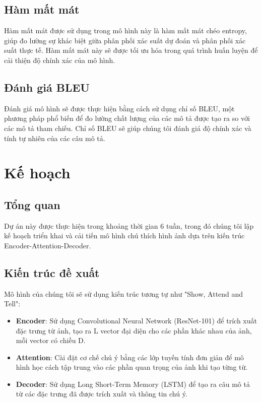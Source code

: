 \documentclass[conference]{IEEEtran}
\begin{document}
\subsection{Hàm mất mát}
Hàm mất mát được sử dụng trong mô hình này là hàm mất mát chéo entropy, giúp đo lường sự khác biệt giữa phân phối xác suất dự đoán và phân phối xác suất thực tế. Hàm mất mát này sẽ được tối ưu hóa trong quá trình huấn luyện để cải thiện độ chính xác của mô hình.

\subsection{Đánh giá BLEU}

Đánh giá mô hình sẽ được thực hiện bằng cách sử dụng chỉ số BLEU, một phương pháp phổ biến để đo lường chất lượng của các mô tả được tạo ra so với các mô tả tham chiếu. Chỉ số BLEU sẽ giúp chúng tôi đánh giá độ chính xác và tính tự nhiên của các câu mô tả.


\section{Kế hoạch}
\subsection{Tổng quan}
Dự án này được thực hiện trong khoảng thời gian 6 tuần, trong đó chúng tôi lập kế hoạch triển khai và cải tiến mô hình chú thích hình ảnh dựa trên kiến trúc Encoder-Attention-Decoder.
\subsection{Kiến trúc đề xuất}
Mô hình của chúng tôi sẽ sử dụng kiến trúc tương tự như "Show, Attend and Tell":
\begin{itemize}
    \item \textbf{Encoder}: Sử dụng Convolutional Neural Network (ResNet-101) để trích xuất đặc trưng từ ảnh, tạo ra L vector đại diện cho các phần khác nhau của ảnh, mỗi vector có chiều D.
    \item \textbf{Attention}: Cài đặt cơ chế chú ý bằng các lớp tuyến tính đơn giản để mô hình học cách tập trung vào các phần quan trọng của ảnh khi tạo từng từ.
    \item \textbf{Decoder}: Sử dụng Long Short-Term Memory (LSTM) để tạo ra câu mô tả từ các đặc trưng đã được trích xuất và thông tin chú ý.
\end{itemize}
\end{document}
